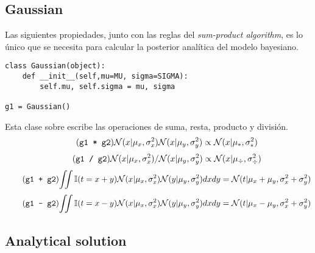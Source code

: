 \documentclass[article]{jss}
\newcommand{\N}{\mathcal{N}}
\begin{document}
\subsection{Gaussian}\label{sec:propiedades}

Las siguientes propiedades, junto con las reglas del \emph{sum-product algorithm}, es lo \'unico que se necesita para calcular la posterior anal\'itica del modelo bayesiano.
%
\begin{lstlisting}
class Gaussian(object):
    def __init__(self,mu=MU, sigma=SIGMA):
        self.mu, self.sigma = mu, sigma

g1 = Gaussian() 
\end{lstlisting}
%
Esta clase sobre escribe las operaciones de suma, resta, producto y división.
%
\begin{equation} \tag{\texttt{g1 * g2}}
 \N(x|\mu_x,\sigma_x^2)\N(x|\mu_y,\sigma_y^2) \propto \N(x|\mu_{*},\sigma_{*}^2)
\end{equation}
%
\begin{equation} \tag{\texttt{g1 / g2}}
 \N(x|\mu_x,\sigma_x^2)/\N(x|\mu_y,\sigma_y^2) \propto \N(x|\mu_{\div},\sigma_{\div}^2)
\end{equation} 
%
\vspace{-0.2cm}
%
\begin{equation} \tag{\texttt{g1 + g2}} \label{eq:suma_normales}
\begin{split}
\iint \mathbb{I}(t = x + y) \N(x|\mu_x, \sigma_x^2)\N(y|\mu_y, \sigma_y^2) dxdy = \N(t|\mu_x+\mu_y,\sigma_x^2 + \sigma_y^2)
\end{split}
\end{equation}
%
\vspace{-0.4cm}
%
\begin{equation} \tag{\texttt{g1 - g2}} \label{eq:resta_normales}
\begin{split}
\iint \mathbb{I}(t = x - y) \N(x|\mu_x, \sigma_x^2)\N(y|\mu_y, \sigma_y^2) dxdy = \N(t|\mu_x - \mu_y,\sigma_x^2 + \sigma_y^2)
\end{split}
\end{equation}

\subsection{Analytical solution} \label{sec:analyticalSolution}
\end{document}
